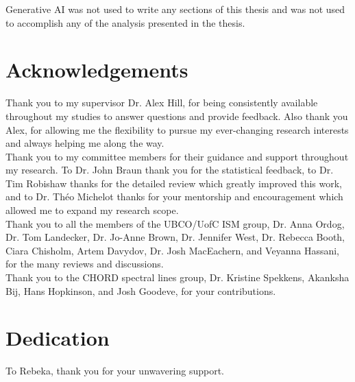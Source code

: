 Generative AI was not used to write any sections of this thesis and was not used to accomplish any of the analysis presented in the thesis. 

\newpage
{} \label{tableofcontent}%
\tableofcontents                %
\newpage 
{} \label{listoftab}%
\listoftables                   %
\newpage
{} \label{listoffig}%
\listoffigures                  %


\chapter{Acknowledgements}      %
Thank you to my supervisor Dr. Alex Hill, for being consistently available throughout my studies to answer questions and provide feedback. Also thank you Alex, for allowing me the flexibility to pursue my ever-changing research interests and always helping me along the way. \\

Thank you to my committee members for their guidance and support throughout my research. To Dr. John Braun thank you for the statistical feedback, to Dr. Tim Robishaw thanks for the detailed review which greatly improved this work, and to Dr. Théo Michelot thanks for your mentorship and encouragement which allowed me to expand my research scope.\\

Thank you to all the members of the UBCO/UofC ISM group, Dr. Anna Ordog, Dr. Tom Landecker, Dr. Jo-Anne Brown, Dr. Jennifer West, Dr. Rebecca Booth, Ciara Chisholm, Artem Davydov, Dr. Josh MacEachern, and Veyanna Hassani, for the many reviews and discussions.\\

Thank you to the CHORD spectral lines group, Dr. Kristine Spekkens, Akanksha Bij, Hans Hopkinson, and Josh Goodeve, for your contributions.


\chapter{Dedication} %
To Rebeka, thank you for your unwavering support.




\mainmatter
